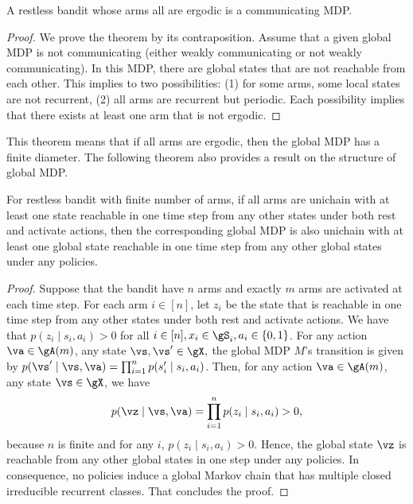 \begin{thm}
    \label{thm:aperiodic_RB_comm} A restless bandit whose arms all are ergodic is a communicating MDP.
\end{thm}
\begin{proof}
    We prove the theorem by its contraposition. Assume that a given global MDP is not communicating (either weakly communicating or not weakly communicating).
    In this MDP, there are global states that are not reachable from each other.
    This implies to two possibilities: (1) for some arms, some local states are not recurrent, (2) all arms are recurrent but periodic.
    Each possibility implies that there exists at least one arm that is not ergodic.
\end{proof}
This theorem means that if all arms are ergodic, then the global MDP has a finite diameter.
The following theorem also provides a result on the structure of global MDP.

\begin{thm}
    \label{thm:unichain}
    For restless bandit with finite number of arms, if all arms are unichain with at least one state reachable in one time step from any other states under both rest and activate actions, then the corresponding global MDP is also unichain with at least one global state reachable in one time step from any other global states under any policies.
\end{thm}
\begin{proof}
    Suppose that the bandit have $n$ arms and exactly $m$ arms are activated at each time step.
    For each arm $i\in[n]$, let $z_i$ be the state that is reachable in one time step from any other states under both rest and activate actions.
    We have that $p(z_i \mid s_i, a_i)>0$ for all $i\in[n], x_i\in\gS_i,a_i\in\{0,1\}$.
    For any action $\va\in\gA(m)$, any state $\vs,\vs'\in\gX,$ the global MDP $M$'s transition is given by ${p(\vs' \mid \vs, \va) =\prod_{i=1}^n p(s'_i \mid s_i, a_i)}$.
    Then, for any action $\va\in\gA(m)$, any state $\vs\in\gX$, we have
    \begin{align*}
        p(\vz \mid \vs, \va) =\prod_{i=1}^n p(z_i \mid s_i,a_i) > 0,
    \end{align*}
    because $n$ is finite and for any $i$, $p(z_i \mid s_i, a_i)>0$.
    Hence, the global state $\vz$ is reachable from any other global states in one step under any policies.
    In consequence, no policies induce a global Markov chain that has multiple closed irreducible recurrent classes.
    That concludes the proof.
\end{proof}

